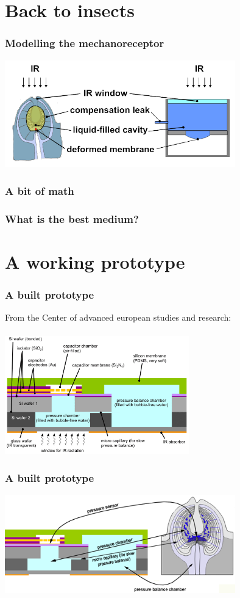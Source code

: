 \documentclass[14pt]{beamer}
\begin{document}
\section{Back to insects}
\begin{frame}
\frametitle{Modelling the mechanoreceptor}
\includegraphics[width=10cm]{themodel.png}
\end{frame}

\begin{frame}
\frametitle{A bit of math}
\end{frame}

\begin{frame}
\frametitle{What is the best medium?}

\end{frame}

\section{A working prototype}
\begin{frame}
\frametitle{A built prototype}
From the Center of advanced european studies and research:\\
~\\
\includegraphics[width=8cm]{IR_sensor_abb_4_02.png}
\end{frame}
\begin{frame}
\frametitle{A built prototype}
\includegraphics[width=10cm]{IR_sensor_abb_5_02.png}
\end{frame}
\end{document}
